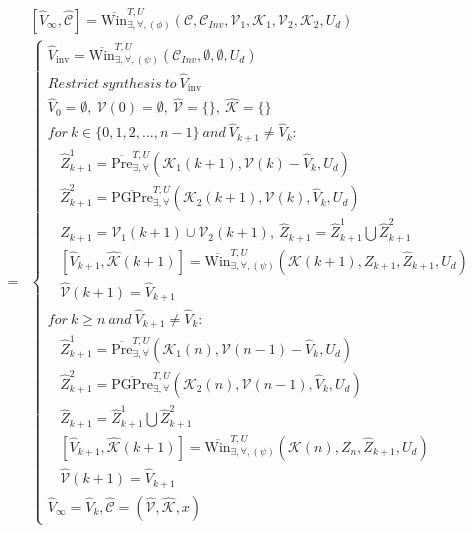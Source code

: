 \begin{align}
&[\widehat{V}_\infty, \widehat{\mathcal{C}}]=\overline{\text{Win}}_{\exists, \forall,(\phi)}^{T,U}(\mathcal{C},\mathcal{C}_{Inv},\mathcal{V}_1,\mathcal{K}_1,\mathcal{V}_2,\mathcal{K}_2,U_d)\\
=&\begin{cases}\widehat{V}_{\text{inv}} = \overline{\text{Win}}^{T,U}_{\exists, \forall,(\psi)} (\mathcal{C}_{Inv},\emptyset,\emptyset,U_d)\\
Restrict~ synthesis~ to~ \widehat{V}_{\text{inv}}\\
\widehat{V}_0 = \emptyset,\ \mathcal{V}(0)=\emptyset,\ \widehat{\mathcal{V}}=\{\},\ \widehat{\mathcal{K}}=\{\}\\
for~k\in \{0,1,2,...,n-1\}\ and\ \widehat{V}_{k+1}\not=\widehat{V}_k:\\
\ \ \ \ \widehat{Z}_{k+1}^1 =  \overline{\text{Pre}}_{\exists,\forall}^{T,U}(\mathcal{K}_1(k+1),\mathcal{V}(k)-\widehat{V}_k,U_d)\\
\ \ \ \ \widehat{Z}_{k+1}^2 = \overline{\text{PGPre}}_{\exists,\forall}^{T,U} ( \mathcal{K}_2(k+1),\mathcal{V}(k), \widehat{V}_k,U_d)\\
\ \ \ \ Z_{k+1}=\mathcal{V}_1(k+1)\cup\mathcal{V}_2(k+1),\  \widehat{Z}_{k+1} = \widehat{Z}_{k+1}^1\bigcup\widehat{Z}_{k+1}^2  \\
\ \ \ \ [\widehat{V}_{k+1},\widehat{\mathcal{K}}(k+1)]=\overline{\text{Win}}_{\exists,\forall,(\psi)}^{T, U}(\mathcal{K}(k+1),Z_{k+1},\widehat{Z}_{k+1},U_d)\\
\ \ \ \ \widehat{\mathcal{V}}(k+1)=\widehat{V}_{k+1}\\
for~ k\geq n\ and\ \widehat{V}_{k+1}\not=\widehat{V}_k:\\
\ \ \ \ \widehat{Z}_{k+1}^1 =  \overline{\text{Pre}}_{\exists,\forall}^{T,U}(\mathcal{K}_1(n),\mathcal{V}(n-1)-\widehat{V}_k,U_d)\\
\ \ \ \ \widehat{Z}_{k+1}^2 = \overline{\text{PGPre}}_{\exists,\forall}^{T,U} ( \mathcal{K}_2(n),\mathcal{V}(n-1), \widehat{V}_k,U_d)\\
\ \ \ \ \widehat{Z}_{k+1} = \widehat{Z}_{k+1}^1\bigcup\widehat{Z}_{k+1}^2  \\
\ \ \ \ [\widehat{V}_{k+1},\widehat{\mathcal{K}}(k+1)]=\overline{\text{Win}}_{\exists,\forall,(\psi)}^{T, U}(\mathcal{K}(n),Z_{n},\widehat{Z}_{k+1},U_d)\\
\ \ \ \ \widehat{\mathcal{V}}(k+1)=\widehat{V}_{k+1}\\
\widehat{V}_\infty = \widehat{V}_k, \widehat{\mathcal{C}} = (\widehat{\mathcal{V}},\widehat{\mathcal{K}},x) 
\end{cases}\label{patching_final}
\end{align}

